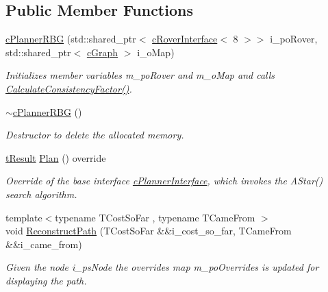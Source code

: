 \subsection*{Public Member Functions}
\begin{DoxyCompactItemize}
\item 
\mbox{\hyperlink{classplanner_1_1c_planner_r_b_g_a91296b98e64effc16f38e2430746d94d}{c\+Planner\+R\+BG}} (std\+::shared\+\_\+ptr$<$ \mbox{\hyperlink{classplanner_1_1c_rover_interface}{c\+Rover\+Interface}}$<$ 8 $>$$>$ i\+\_\+po\+Rover, std\+::shared\+\_\+ptr$<$ \mbox{\hyperlink{classplanner_1_1c_graph}{c\+Graph}} $>$ i\+\_\+o\+Map)
\begin{DoxyCompactList}\small\item\em Initializes member variables m\+\_\+po\+Rover and m\+\_\+o\+Map and calls \mbox{\hyperlink{classplanner_1_1c_planner_a2e5a745f83f903662eff914d8beddb5e}{Calculate\+Consistency\+Factor()}}. \end{DoxyCompactList}\item 
\mbox{\label{classplanner_1_1c_planner_r_b_g_ad582fdf21ae0d86a23e9c25546b66f0e}} 
\mbox{\hyperlink{classplanner_1_1c_planner_r_b_g_ad582fdf21ae0d86a23e9c25546b66f0e}{$\sim$c\+Planner\+R\+BG}} ()
\begin{DoxyCompactList}\small\item\em Destructor to delete the allocated memory. \end{DoxyCompactList}\item 
\mbox{\hyperlink{structt_result}{t\+Result}} \mbox{\hyperlink{classplanner_1_1c_planner_r_b_g_a0bbd752702da582a47dbd153c0065eb5}{Plan}} () override
\begin{DoxyCompactList}\small\item\em Override of the base interface \mbox{\hyperlink{classplanner_1_1c_planner_interface}{c\+Planner\+Interface}}, which invokes the A\+Star() search algorithm. \end{DoxyCompactList}\item 
{\footnotesize template$<$typename T\+Cost\+So\+Far , typename T\+Came\+From $>$ }\\void \mbox{\hyperlink{classplanner_1_1c_planner_r_b_g_a1af74d398b286f1e05e6ade495efbbd0}{Reconstruct\+Path}} (T\+Cost\+So\+Far \&\&i\+\_\+cost\+\_\+so\+\_\+far, T\+Came\+From \&\&i\+\_\+came\+\_\+from)
\begin{DoxyCompactList}\small\item\em Given the node i\+\_\+ps\+Node the overrides map m\+\_\+po\+Overrides is updated for displaying the path. \end{DoxyCompactList}\end{DoxyCompactItemize}
